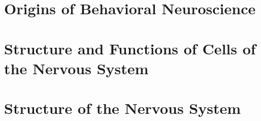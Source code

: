 \documentclass[12pt, oneside]{book}
\begin{document}
\fancyhead[R]{\leftmark}





\setcounter{chapter}{0}
\chapter{Origins of Behavioral Neuroscience}
\vspace*{-0.25in}


\setcounter{chapter}{1}
\chapter{Structure and Functions of Cells of the Nervous System}
\vspace*{-0.25in}


\setcounter{chapter}{2}
\chapter{Structure of the Nervous System}
\vspace*{-0.25in}




\end{document}
